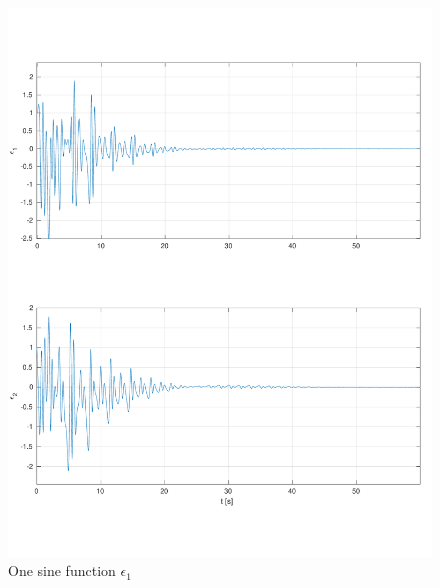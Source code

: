 \documentclass[]{article}
\begin{document}
\begin{figure}[H]
\centering
\includegraphics[width=1\columnwidth]{one_sine_error.pdf}
\caption{One sine function $\epsilon_1$}
\label{fig:one_sine_error}
\end{figure}
\end{document}
